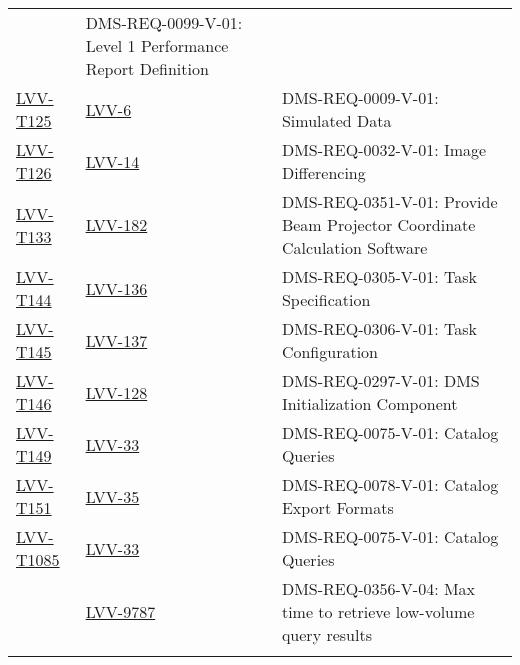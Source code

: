 \begin{longtable}{p{3cm}p{3cm}L{9cm}}
  & DMS-REQ-0099-V-01: Level 1 Performance Report Definition
 \\ 
\hline
\href{https://jira.lsstcorp.org/secure/Tests.jspa#/testCase/LVV-T125}{LVV-T125} &
  \href{https://jira.lsstcorp.org/browse/LVV-6}{LVV-6}
  & DMS-REQ-0009-V-01: Simulated Data
 \\ 
\hline
\href{https://jira.lsstcorp.org/secure/Tests.jspa#/testCase/LVV-T126}{LVV-T126} &
  \href{https://jira.lsstcorp.org/browse/LVV-14}{LVV-14}
  & DMS-REQ-0032-V-01: Image Differencing
 \\ 
\hline
\href{https://jira.lsstcorp.org/secure/Tests.jspa#/testCase/LVV-T133}{LVV-T133} &
  \href{https://jira.lsstcorp.org/browse/LVV-182}{LVV-182}
  & DMS-REQ-0351-V-01: Provide Beam Projector Coordinate Calculation
Software
 \\ 
\hline
\href{https://jira.lsstcorp.org/secure/Tests.jspa#/testCase/LVV-T144}{LVV-T144} &
  \href{https://jira.lsstcorp.org/browse/LVV-136}{LVV-136}
  & DMS-REQ-0305-V-01: Task Specification
 \\ 
\hline
\href{https://jira.lsstcorp.org/secure/Tests.jspa#/testCase/LVV-T145}{LVV-T145} &
  \href{https://jira.lsstcorp.org/browse/LVV-137}{LVV-137}
  & DMS-REQ-0306-V-01: Task Configuration
 \\ 
\hline
\href{https://jira.lsstcorp.org/secure/Tests.jspa#/testCase/LVV-T146}{LVV-T146} &
  \href{https://jira.lsstcorp.org/browse/LVV-128}{LVV-128}
  & DMS-REQ-0297-V-01: DMS Initialization Component
 \\ 
\hline
\href{https://jira.lsstcorp.org/secure/Tests.jspa#/testCase/LVV-T149}{LVV-T149} &
  \href{https://jira.lsstcorp.org/browse/LVV-33}{LVV-33}
  & DMS-REQ-0075-V-01: Catalog Queries
 \\ 
\hline
\href{https://jira.lsstcorp.org/secure/Tests.jspa#/testCase/LVV-T151}{LVV-T151} &
  \href{https://jira.lsstcorp.org/browse/LVV-35}{LVV-35}
  & DMS-REQ-0078-V-01: Catalog Export Formats
 \\ 
\hline
\href{https://jira.lsstcorp.org/secure/Tests.jspa#/testCase/LVV-T1085}{LVV-T1085} &
  \href{https://jira.lsstcorp.org/browse/LVV-33}{LVV-33}
  & DMS-REQ-0075-V-01: Catalog Queries
 \\ 
 &   \href{https://jira.lsstcorp.org/browse/LVV-9787}{LVV-9787}
  & DMS-REQ-0356-V-04: Max time to retrieve low-volume query results
 \\ 
\hline

\end{longtable}
